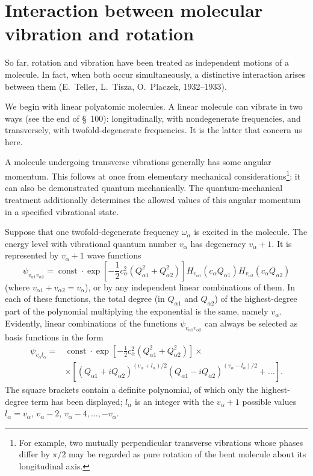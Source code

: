 \section{Interaction between molecular vibration and rotation}

So far, rotation and vibration have been treated as independent motions of a molecule. In fact, when both occur simultaneously, a distinctive interaction arises between them (E.~Teller, L.~Tisza, O.~Placzek, 1932--1933).

We begin with linear polyatomic molecules. A linear molecule can vibrate in two ways (see the end of §~100): longitudinally, with nondegenerate frequencies, and transversely, with twofold-degenerate frequencies. It is the latter that concern us here.

A molecule undergoing transverse vibrations generally has some angular momentum. This follows at once from elementary mechanical considerations\footnote{For example, two mutually perpendicular transverse vibrations whose phases differ by $\pi/2$ may be regarded as pure rotation of the bent molecule about its longitudinal axis.}; it can also be demonstrated quantum mechanically. The quantum-mechanical treatment additionally determines the allowed values of this angular momentum in a specified vibrational state.

Suppose that one twofold-degenerate frequency $\omega_\alpha$ is excited in the molecule. The energy level with vibrational quantum number $v_\alpha$ has degeneracy $v_\alpha+1$. It is represented by $v_\alpha+1$ wave functions
\[
 \psi_{v_{\alpha1}v_{\alpha2}}=\operatorname{const}\cdot
 \exp\left[-\frac12c_\alpha^2(Q_{\alpha1}^2+Q_{\alpha2}^2)\right]
 H_{v_{\alpha1}}(c_\alpha Q_{\alpha1})H_{v_{\alpha2}}(c_\alpha Q_{\alpha2})
\]
(where $v_{\alpha1}+v_{\alpha2}=v_\alpha$), or by any independent linear combinations of them. In each of these functions, the total degree (in $Q_{\alpha1}$ and $Q_{\alpha2}$) of the highest-degree part of the polynomial multiplying the exponential is the same, namely $v_\alpha$. Evidently, linear combinations of the functions $\psi_{v_{\alpha1}v_{\alpha2}}$ can always be selected as basis functions in the form
\begin{equation}
 \begin{split}
 \psi_{v_\alpha l_\alpha}={}&\operatorname{const}\cdot
 \exp\left[-\frac12c_\alpha^2(Q_{\alpha1}^2+Q_{\alpha2}^2)\right]\times\\
 &\times\left[(Q_{\alpha1}+iQ_{\alpha2})^{(v_\alpha+l_\alpha)/2}
 (Q_{\alpha1}-iQ_{\alpha2})^{(v_\alpha-l_\alpha)/2}+\ldots\right].
 \end{split}
 \tag{104.1}
\end{equation}
The square brackets contain a definite polynomial, of which only the highest-degree term has been displayed; $l_\alpha$ is an integer with the $v_\alpha+1$ possible values $l_\alpha=v_\alpha$, $v_\alpha-2$, $v_\alpha-4,\ldots,-v_\alpha$.

